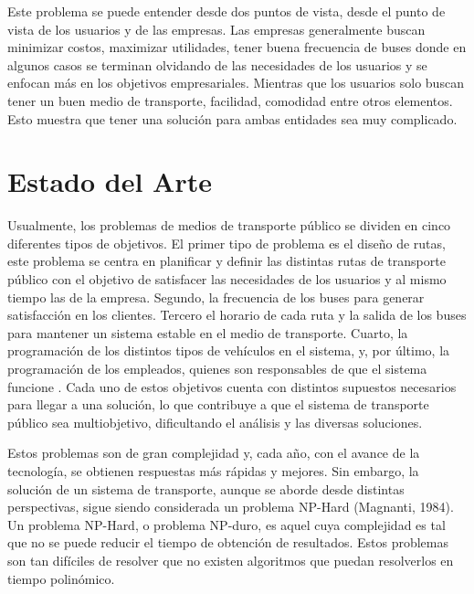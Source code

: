 \documentclass[preprint,11pt]{elsarticle}
\begin{document}
Este problema se puede entender desde dos puntos de vista, desde el punto de vista de los usuarios y de las empresas. Las empresas generalmente buscan minimizar costos, maximizar utilidades, tener buena frecuencia de buses donde en algunos casos se terminan olvidando de las necesidades de los usuarios y se enfocan más en los objetivos empresariales. Mientras que los usuarios solo buscan tener un buen medio de transporte, facilidad, comodidad entre otros elementos. Esto muestra que tener una solución para ambas entidades sea muy complicado. 

 


\section{Estado del Arte}
\vspace{-1mm}
\label{Int}
Usualmente, los problemas de medios de transporte público se dividen en cinco diferentes tipos de objetivos. El primer tipo de problema es el diseño de rutas, este problema se centra en planificar y definir las distintas rutas de transporte público con el objetivo de satisfacer las necesidades de los usuarios y al mismo tiempo las de la empresa. Segundo, la frecuencia de los buses para generar satisfacción en los clientes. Tercero el horario de cada ruta y la salida de los buses para mantener un sistema estable en el medio de transporte. Cuarto, la programación de los distintos tipos de vehículos en el sistema, y, por último, la programación de los empleados, quienes son responsables de que el sistema funcione . Cada uno de estos objetivos cuenta con distintos supuestos necesarios para llegar a una solución, lo que contribuye a que el sistema de transporte público sea multiobjetivo, dificultando el análisis y las diversas soluciones.

Estos problemas son de gran complejidad y, cada año, con el avance de la tecnología, se obtienen respuestas más rápidas y mejores. Sin embargo, la solución de un sistema de transporte, aunque se aborde desde distintas perspectivas, sigue siendo considerada un problema NP-Hard (Magnanti, 1984)\cite{magnanti1984}. Un problema NP-Hard, o problema NP-duro, es aquel cuya complejidad es tal que no se puede reducir el tiempo de obtención de resultados. Estos problemas son tan difíciles de resolver que no existen algoritmos que puedan resolverlos en tiempo polinómico.
\end{document}
